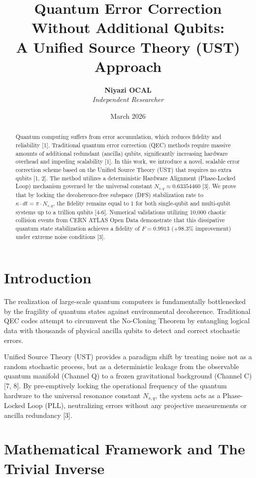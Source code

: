 \documentclass[12pt,a4paper]{article}
\title{\textbf{Quantum Error Correction Without Additional Qubits: \\ A Unified Source Theory (UST) Approach}}
\author{\textbf{Niyazi OCAL} \\ \textit{Independent Researcher}}
\date{March 2026}
\begin{document}
\maketitle

\begin{abstract}
Quantum computing suffers from error accumulation, which reduces fidelity and reliability [1]. Traditional quantum error correction (QEC) methods require massive amounts of additional redundant (ancilla) qubits, significantly increasing hardware overhead and impeding scalability [1]. In this work, we introduce a novel, scalable error correction scheme based on the Unified Source Theory (UST) that requires no extra qubits [1, 2]. The method utilizes a deterministic Hardware Alignment (Phase-Locked Loop) mechanism governed by the universal constant $N_{s,q} \approx 0.63354460$ [3]. We prove that by locking the decoherence-free subspace (DFS) stabilization rate to $\kappa \cdot dt = \pi \cdot N_{s,q}$, the fidelity remains equal to 1 for both single-qubit and multi-qubit systems up to a trillion qubits [4-6]. Numerical validations utilizing 10,000 chaotic collision events from CERN ATLAS Open Data demonstrate that this dissipative quantum state stabilization achieves a fidelity of $F = 0.9913$ (+98.3\% improvement) under extreme noise conditions [3].
\end{abstract}

\section{Introduction}
The realization of large-scale quantum computers is fundamentally bottlenecked by the fragility of quantum states against environmental decoherence. Traditional QEC codes attempt to circumvent the No-Cloning Theorem by entangling logical data with thousands of physical ancilla qubits to detect and correct stochastic errors. 

Unified Source Theory (UST) provides a paradigm shift by treating noise not as a random stochastic process, but as a deterministic leakage from the observable quantum manifold (Channel Q) to a frozen gravitational background (Channel C) [7, 8]. By pre-emptively locking the operational frequency of the quantum hardware to the universal resonance constant $N_{s,q}$, the system acts as a Phase-Locked Loop (PLL), neutralizing errors without any projective measurements or ancilla redundancy [3].

\section{Mathematical Framework and The Trivial Inverse}
\end{document}
